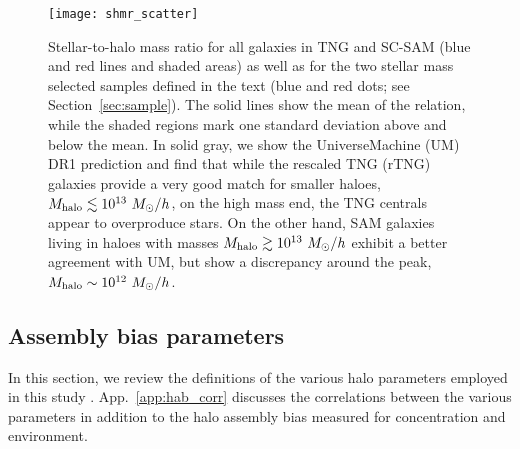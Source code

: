 \documentclass[fleqn,usenatbib]{mnras}
\newcommand{\rss}[1]{\textcolor{purple}{(rss: #1)}}
\begin{document}
\begin{figure}
\centering  
\texttt{[image: shmr\_scatter]}
\caption{Stellar-to-halo mass ratio for all galaxies in TNG and SC-SAM (blue and red lines and shaded areas) as well as for the two stellar mass selected samples defined in the text (blue and red dots; see Section~\ref{sec:sample}). The solid lines show the mean of the relation, while the shaded regions mark one standard deviation above and below the mean.
In solid gray, we show the UniverseMachine (UM) DR1 prediction and find that while the rescaled TNG (rTNG) galaxies 
provide a very good match for smaller haloes, $M_{\rm halo} \lesssim 10^{13} \ M_\odot/h$, on the high mass end, the TNG centrals appear to overproduce stars. On the other hand, SAM galaxies living in haloes with masses $M_{\rm halo} \gtrsim 10^{13} \ M_\odot/h$ exhibit a better agreement with UM, but show a discrepancy around the peak, $M_{\rm halo} \sim 10^{12} \ M_\odot/h$. 
}
\label{fig:shmr_scatter}
\end{figure}

\iffalse
\begin{figure}
\centering  
\texttt{[image: prof]}
\caption{Satellite density profiles for a stellar-mass-selected sample with $\sim$3000 satellites at $z = 0$. In solid blue, we show the satellite profile of the SAM galaxy sample, while in solid red, we show the result for TNG. Stark cut}
\label{fig:prof}
\end{figure}https://www.overleaf.com/project/5f5d3d123f29aa0001f49bed
\fi

\subsection{Assembly bias parameters}
\label{sec:params}
In this section, we review the definitions of the various halo parameters employed in this study \citep[for more details, see][]{2020MNRAS.493.5506H}. App.~\ref{app:hab_corr} discusses the correlations between the various parameters in addition to the halo assembly bias measured for concentration and environment.
\end{document}
